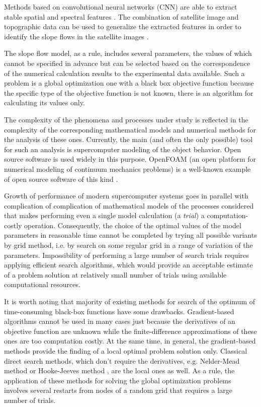 \documentclass[sensors,article,submit,moreauthors,pdftex]{Definitions/mdpi}
\begin{document}
Methods based on convolutional neural networks (CNN) are able to extract stable spatial and spectral features \cite{Maggiori2017}. The combination of satellite image and topographic data can be used to generalize the extracted features in order to identify the slope flows in the satellite images \cite{Qin2021, Prakash2021}.

The slope flow model, as a rule, includes several parameters, the values of which cannot be specified in advance but can be selected based on the correspondence of the numerical calculation results to the experimental data available. Such a problem is a global optimization one with a black box objective function because the specific type of the objective function is not known, there is an algorithm for calculating its values only.

The complexity of the phenomena and processes under study is reflected in the complexity of the corresponding mathematical models and numerical methods for the analysis of these ones. Currently, the main (and often the only possible) tool for such an analysis is supercomputer modeling of the object behavior. Open source software is used widely in this purpose. OpenFOAM (an open platform for numerical modeling of continuum mechanics problems) is a well-known example of open source software of this kind \cite{OpenFOAM}. 

Growth of performance of modern supercomputer systems goes in parallel with complication of complication of mathematical models of the processes considered that makes performing even a single model calculation (a \textit{trial}) a computation-costly operation. Consequently, the choice of the optimal values of the model parameters in reasonable time cannot be completed by trying all possible variants by grid method, i.e. by search on some regular grid in a range of variation of the parameters. Impossibility of performing a large number of search trials requires applying efficient search algorithms, which would provide an acceptable estimate of a problem solution at relatively small number of trials using available computational resources.

It is worth noting that majority of existing methods for search of the optimum of time-consuming black-box functions have some drawbacks. Gradient-based algorithms cannot be used in many cases just because the derivatives of an objective function are unknown while the finite-difference approximations of these ones are too computation costly. At the same time, in general, the gradient-based methods provide the finding of a local optimal problem solution only.
Classical direct search methods, which don't require the derivatives, e.g. Nelder-Mead method \cite{NelderMead} or Hooke-Jeeves method \cite{HookJeeves}, are the local ones as well. As a rule, the application of these methods for solving the global optimization problems involves several restarts from nodes of a random grid that requires a large number of trials. 
\end{document}
